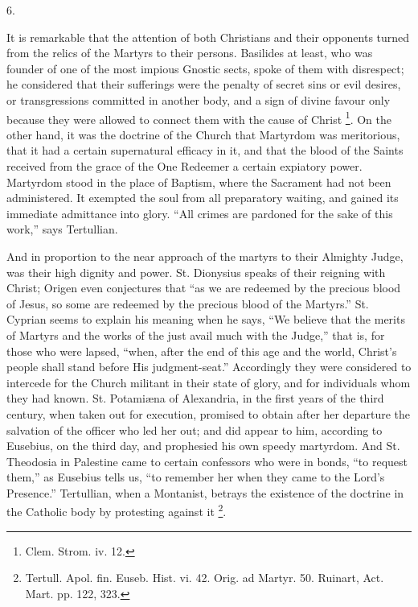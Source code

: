 6.

It is remarkable that the attention of both Christians and their
opponents turned from the relics of the Martyrs to their persons.
Basilides at least, who was founder of one of the most impious Gnostic
sects, spoke of them with disrespect; he considered that their
sufferings were the penalty of secret sins or evil desires, or
transgressions committed in another body, and a sign of divine favour
only because they were allowed to connect them with the cause of
Christ \footnote{Clem. Strom. iv. 12.}. On the other
hand, it was the doctrine of the Church that Martyrdom was
meritorious, that it had a certain supernatural efficacy in it, and
that the blood of the Saints received from the grace of the One
Redeemer a certain expiatory power. Martyrdom stood in the place of
Baptism, where the Sacrament had not been administered. It exempted
the soul from all preparatory waiting, and gained its immediate
admittance into glory. ``All crimes are pardoned for the sake of
this work,'' says Tertullian.

And in proportion to the near approach of the martyrs to their
Almighty Judge, was their high dignity and power. St. Dionysius speaks
of their reigning with Christ; Origen even conjectures that ``as
we are redeemed by the precious blood of Jesus, so some are redeemed
by the precious blood of the Martyrs.'' St. Cyprian seems to
explain his meaning when he says, ``We believe that the merits of
Martyrs and the works of the just avail much with the Judge,''
that is, for those who were lapsed, ``when, after the end of this
age and the world, Christ's people shall stand before His
judgment-seat.'' Accordingly they were considered to intercede for
the Church militant in their state of glory, and for individuals whom
they had known. St. Potamiæna of Alexandria, in the first years of
the third century, when taken out for execution, promised to obtain
after her departure the salvation of the officer who led her out; and
did appear to him, according to Eusebius, on the third day, and
prophesied his own speedy martyrdom. And St. Theodosia in Palestine
came to certain confessors who were in bonds, ``to request
them,'' as Eusebius tells us, ``to remember her when they came
to the Lord's Presence.'' Tertullian, when a Montanist, betrays
the existence of the doctrine in the Catholic body by protesting
against it \footnote{Tertull. Apol. fin. Euseb. Hist. vi. 42.
Orig. ad Martyr. 50. Ruinart, Act. Mart. pp. 122, 323.}.


